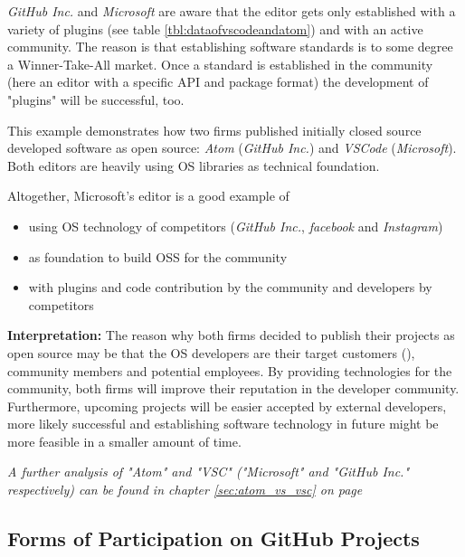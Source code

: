 \textit{GitHub Inc.} and \textit{Microsoft} are aware that the editor gets only established with a variety of plugins (see table \ref{tbl:dataofvscodeandatom}) and with an active community. The reason is that establishing software standards is to some degree a Winner-Take-All market. Once a standard is established in the community (here an editor with a specific API and package format) the development of "plugins" will be successful, too.

This example demonstrates how two firms published initially closed source developed software as open source: \textit{Atom} (\textit{GitHub Inc.}) and \textit{VSCode} (\textit{Microsoft}). Both editors are heavily using OS libraries as technical foundation.

Altogether, Microsoft's editor is a good example of

\begin{itemize}
	\item using OS technology of competitors (\textit{GitHub Inc.}, \textit{facebook} and \textit{Instagram})
	\item as foundation to build OSS for the community
	\item with plugins and code contribution by the community and developers by competitors
\end{itemize}

\textbf{Interpretation:} The reason why both firms decided to publish their projects as open source may be that the OS developers are their target customers (\cite{IntroducingAtom:online}), community members and potential employees. By providing technologies for the community, both firms will improve their reputation in the developer community. Furthermore, upcoming projects will be easier accepted by external developers, more likely successful and establishing software technology in future might be more feasible in a smaller amount of time.

\textit{A further analysis of "Atom" and "VSC" ("Microsoft" and "GitHub Inc." respectively) can be found in chapter \ref{sec:atom_vs_vsc} on page \pageref{sec:atom_vs_vsc}}

\clearpage
\subsection{Forms of Participation on GitHub Projects}
\label{sec:forms_of_participation_on_github}


